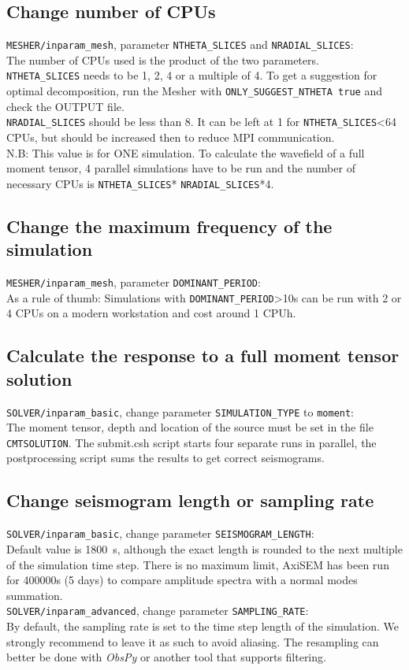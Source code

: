 \documentclass{article}
\begin{document}
\subsection{Change number of CPUs}
\verb|MESHER/inparam_mesh|, parameter \verb|NTHETA_SLICES| and \verb|NRADIAL_SLICES|: \\
The number of CPUs used is the product of the two parameters. \\
\verb|NTHETA_SLICES| needs to be 1, 2, 4 or a multiple of 4. To get a suggestion for optimal decomposition, run the Mesher with \verb|ONLY_SUGGEST_NTHETA true| and check the OUTPUT file.\\
\verb|NRADIAL_SLICES| should be less than 8. It can be left at 1 for \verb|NTHETA_SLICES|<64 CPUs, but should be increased then to reduce MPI communication.\\
N.B: This value is for ONE simulation. To calculate the wavefield of a full moment tensor, 4 parallel simulations have to be run and the number of necessary CPUs is \verb|NTHETA_SLICES|* \verb|NRADIAL_SLICES|*4. 
\subsection{Change the maximum frequency of the simulation}
\verb|MESHER/inparam_mesh|, parameter \verb|DOMINANT_PERIOD|: \\
As a rule of thumb: Simulations with \verb|DOMINANT_PERIOD|>10s can be run with 2 or 4 CPUs on a modern workstation and cost around 1 CPUh.
\subsection{Calculate the response to a full moment tensor solution}
\verb|SOLVER/inparam_basic|, change parameter \verb|SIMULATION_TYPE| to \verb|moment|:\\
The moment tensor, depth and location of the source must be set in the file \verb|CMTSOLUTION|. The submit.csh script starts four separate runs in parallel, the postprocessing script sums the results to get correct seismograms.
\subsection{Change seismogram length or sampling rate}
\verb|SOLVER/inparam_basic|, change parameter \verb|SEISMOGRAM_LENGTH|:\\
Default value is 1800~s, although the exact length is rounded to the next multiple of the simulation time step. There is no maximum limit, AxiSEM has been run for 400000s (5 days) to compare amplitude spectra with a normal modes summation.\\
\verb|SOLVER/inparam_advanced|, change parameter \verb|SAMPLING_RATE|:\\
By default, the sampling rate is set to the time step length of the simulation. We strongly recommend to leave it as such to avoid aliasing. The resampling can better be done with \textit{ObsPy} or another tool that supports filtering.
\end{document}
